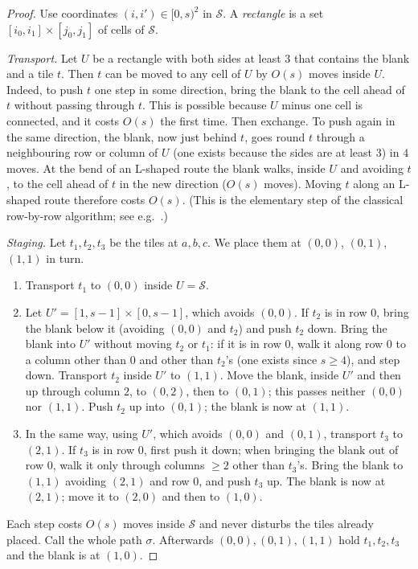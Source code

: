 \documentclass[11pt]{amsart}
\theoremstyle{definition}
\begin{document}
\begin{proof}
Use coordinates $(i,i')\in[0,s)^2$ in $\mathcal S$. A \emph{rectangle} is a set $[i_0,i_1]\times[j_0,j_1]$ of cells of $\mathcal S$.

\emph{Transport.} Let $U$ be a rectangle with both sides at least $3$ that contains the blank and a tile $t$.
Then $t$ can be moved to any cell of $U$ by $O(s)$ moves inside $U$. Indeed, to push $t$ one step in some
direction, bring the blank to the cell ahead of $t$ without passing through $t$. This is possible
because $U$ minus one cell is connected, and it costs $O(s)$ the first time. Then exchange. To push again in the same
direction, the blank, now just behind $t$, goes round $t$ through a neighbouring row or column of $U$ (one exists
because the sides are at least $3$) in $4$ moves. At the bend of an L-shaped route the blank walks, inside $U$ and avoiding $t$, to the cell ahead of $t$ in
the new direction ($O(s)$ moves). Moving $t$ along an L-shaped route therefore costs $O(s)$. (This is the elementary step of
the classical row-by-row algorithm; see e.g.~\cite{parberry}.)

\emph{Staging.} Let $t_1,t_2,t_3$ be the tiles at $a,b,c$. We place them at $(0,0)$, $(0,1)$, $(1,1)$ in turn.
\begin{enumerate}[nosep]
\item Transport $t_1$ to $(0,0)$ inside $U=\mathcal S$.
\item Let $U'=[1,s-1]\times[0,s-1]$, which avoids $(0,0)$. If $t_2$ is in row $0$, bring the blank below it
  (avoiding $(0,0)$ and $t_2$) and push $t_2$ down. Bring the blank into $U'$ without moving $t_2$ or $t_1$: if it is in row $0$, walk it along row $0$ to a column other than $0$ and other
than $t_2$'s (one exists since $s\ge4$), and step down. Transport $t_2$ inside $U'$
  to $(1,1)$. Move the blank, inside $U'$ and then up through column $2$, to $(0,2)$, then to $(0,1)$; this passes
  neither $(0,0)$ nor $(1,1)$. Push $t_2$ up into $(0,1)$; the blank is now at $(1,1)$.
\item In the same way, using $U'$, which avoids $(0,0)$ and $(0,1)$, transport $t_3$ to $(2,1)$. If $t_3$ is in row $0$, first push it
  down; when bringing the blank out of row $0$, walk it only through columns $\ge2$ other than $t_3$'s. Bring the blank to $(1,1)$ avoiding $(2,1)$ and row $0$, and push $t_3$ up. The blank is now at $(2,1)$;
  move it to $(2,0)$ and then to $(1,0)$.
\end{enumerate}
Each step costs $O(s)$ moves inside $\mathcal S$ and never disturbs the tiles already placed. Call the whole path $\sigma$.
Afterwards $(0,0),(0,1),(1,1)$ hold $t_1,t_2,t_3$ and the blank is at $(1,0)$.


\end{proof}
\end{document}
